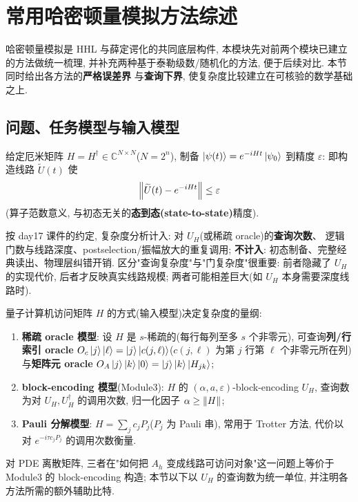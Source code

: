 \documentclass[utf8]{article} %
\numberwithin{equation}{section}   %
\newtheorem{Def}{\hskip 2em {\color{green} 定义}}[subsection]
\newtheorem{Note}{\hskip 2em {\color{red} 注}}[subsection]
\begin{document}
\section{常用哈密顿量模拟方法综述}

哈密顿量模拟是 HHL 与薛定谔化的共同底层构件, 本模块先对前两个模块已建立的方法做统一梳理,
并补充两种基于泰勒级数/随机化的方法, 便于后续对比. 本节同时给出各方法的\textbf{严格误差界}
与\textbf{查询下界}, 使复杂度比较建立在可核验的数学基础之上.

\subsection{问题、任务模型与输入模型}

\begin{Def}[哈密顿量模拟问题]
    给定厄米矩阵 $H = H^\dagger \in \mathbb{C}^{N\times N}$($N = 2^n$), 制备
    $\ket{\psi(t)} = e^{-iHt}\ket{\psi_0}$ 到精度 $\varepsilon$: 即构造线路
    $\widetilde U(t)$ 使
    \begin{equation}
        \norm{\widetilde U(t) - e^{-iHt}} \le \varepsilon
    \end{equation}
    (算子范数意义, 与初态无关的\textbf{态到态(state-to-state)}精度).
\end{Def}

\begin{Note}
    按 day17 课件的约定, 复杂度分析计入: 对 $U_H$(或稀疏 oracle)的\textbf{查询次数}、
    逻辑门数与线路深度、postselection/振幅放大的重复调用;
    \textbf{不计入}: 初态制备、完整经典读出、物理层纠错开销.
    区分"查询复杂度"与"门复杂度"很重要: 前者隐藏了 $U_H$ 的实现代价,
    后者才反映真实线路规模; 两者可能相差巨大(如 $U_H$ 本身需要深度线路时).
\end{Note}

\begin{Note}[三种输入模型]
    量子计算机访问矩阵 $H$ 的方式(输入模型)决定复杂度的量纲:
    \begin{enumerate}
        \item \textbf{稀疏 oracle 模型}: 设 $H$ 是 $s$-稀疏的(每行每列至多 $s$ 个非零元),
        可查询\textbf{列/行索引 oracle} $O_c\ket j\ket\ell = \ket j\ket{c(j,\ell)}$($c(j,\ell)$ 为第 $j$ 行第 $\ell$ 个非零元所在列)
        与\textbf{矩阵元 oracle} $O_A\ket j\ket k\ket 0 = \ket j\ket k\ket{H_{jk}}$;
        \item \textbf{block-encoding 模型}(Module3): $H$ 的 $(\alpha, a, \varepsilon)$-block-encoding
        $U_H$, 查询数为对 $U_H, U_H^\dagger$ 的调用次数, 归一化因子 $\alpha \ge \norm{H}$;
        \item \textbf{Pauli 分解模型}: $H = \sum_{j} c_j P_j$($P_j$ 为 Pauli 串),
        常用于 Trotter 方法, 代价以对 $e^{-i\tau c_j P_j}$ 的调用次数衡量.
    \end{enumerate}
    对 PDE 离散矩阵, 三者在"如何把 $A_h$ 变成线路可访问对象"这一问题上等价于
    Module3 的 block-encoding 构造; 本节以下以 $U_H$ 的查询数为统一单位,
    并注明各方法所需的额外辅助比特.
\end{Note}
\end{document}

